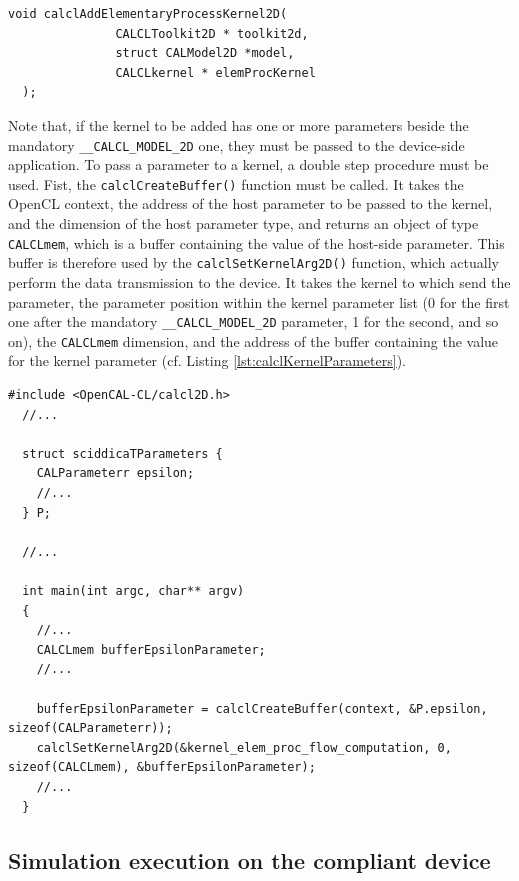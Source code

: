 \begin{lstlisting}[float,floatplacement=H, label=lst:calclAddElementaryProcessKernel2D, caption=The calclCreateToolkit2D function., numbers=none]
  void calclAddElementaryProcessKernel2D(
               CALCLToolkit2D * toolkit2d,
               struct CALModel2D *model,
               CALCLkernel * elemProcKernel
  );
\end{lstlisting}

Note that, if the kernel to be added has one or more parameters beside
the mandatory \verb'__CALCL_MODEL_2D' one, they must be passed to the
device-side application. To pass a parameter to a kernel, a double
step procedure must be used. Fist, the \verb'calclCreateBuffer()'
function must be called. It takes the OpenCL context, the address of
the host parameter to be passed to the kernel, and the dimension of
the host parameter type, and returns an object of type
\verb'CALCLmem', which is a buffer containing the value of the
host-side parameter. This buffer is therefore used by the
\verb'calclSetKernelArg2D()' function, which actually perform the data
transmission to the device. It takes the kernel to which send the
parameter, the parameter position within the kernel parameter list (0
for the first one after the mandatory \verb'__CALCL_MODEL_2D'
parameter, 1 for the second, and so on), the \verb'CALCLmem'
dimension, and the address of the buffer containing the value for the
kernel parameter (cf. Listing \ref{lst:calclKernelParameters}).

\begin{lstlisting}[float,floatplacement=H, label=lst:calclKernelParameters, caption=Passing parametrs to kernel.]
  #include <OpenCAL-CL/calcl2D.h>
  //...
  
  struct sciddicaTParameters {
    CALParameterr epsilon;
    //...
  } P;

  //...
  
  int main(int argc, char** argv)
  {
    //...
    CALCLmem bufferEpsilonParameter;
    //...

    bufferEpsilonParameter = calclCreateBuffer(context, &P.epsilon, sizeof(CALParameterr));
    calclSetKernelArg2D(&kernel_elem_proc_flow_computation, 0, sizeof(CALCLmem), &bufferEpsilonParameter);    
    //...
  }
\end{lstlisting}


\subsection{Simulation execution on the compliant device}

